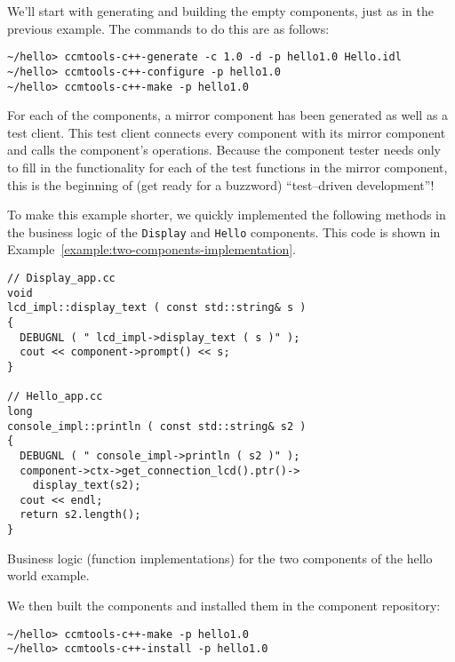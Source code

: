 We'll start with generating and building the empty components, just as in the
previous example. The commands to do this are as follows:
\begin{small}
\begin{verbatim}
~/hello> ccmtools-c++-generate -c 1.0 -d -p hello1.0 Hello.idl
~/hello> ccmtools-c++-configure -p hello1.0
~/hello> ccmtools-c++-make -p hello1.0
\end{verbatim}
\end{small}

For each of the components, a mirror component has been generated as well as a
test client. This test client connects every component with its mirror component
and calls the component's operations. Because the component tester needs only to
fill in the functionality for each of the test functions in the mirror
component, this is the beginning of (get ready for a buzzword) ``test--driven
development''!

To make this example shorter, we quickly implemented the following methods in
the business logic of the {\tt Display} and {\tt Hello} components. This code is
shown in Example~\ref{example:two-components-implementation}.

\begin{Example}
\begin{minifbox}
\begin{small}
\begin{verbatim}
// Display_app.cc
void
lcd_impl::display_text ( const std::string& s )
{
  DEBUGNL ( " lcd_impl->display_text ( s )" );
  cout << component->prompt() << s;
}

// Hello_app.cc
long
console_impl::println ( const std::string& s2 )
{
  DEBUGNL ( " console_impl->println ( s2 )" );
  component->ctx->get_connection_lcd().ptr()->
    display_text(s2);
  cout << endl;
  return s2.length();
}
\end{verbatim}
\end{small}
\end{minifbox}
\caption{Business logic (function implementations) for the two components of the
hello world example.}
\label{example:two-components-implementation}
\end{Example}

We then built the components and installed them in the component repository:
\begin{small}
\begin{verbatim}
~/hello> ccmtools-c++-make -p hello1.0
~/hello> ccmtools-c++-install -p hello1.0
\end{verbatim}
\end{small}

